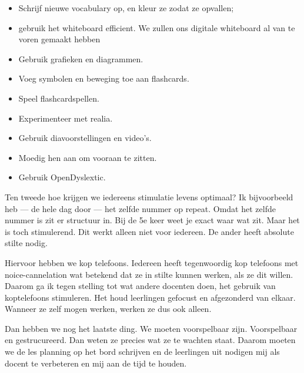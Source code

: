                 \begin{itemize}
                    \setlength\itemsep{0em}
                    \item Schrijf nieuwe vocabulary op, en kleur ze zodat ze opvallen;
                    \item gebruik het whiteboard efficient. We zullen ons digitale whiteboard al van te voren gemaakt hebben
                    \item Gebruik grafieken en diagrammen.
                    \item Voeg symbolen en beweging toe aan flashcards.
                    \item Speel flashcardspellen.
                    \item Experimenteer met realia.
                    \item Gebruik diavoorstellingen en video's.
                    \item Moedig hen aan om vooraan te zitten.
                    \item Gebruik OpenDyslextic.
                \end{itemize}
                
                \bigskip
                
                \noindent Ten tweede hoe krijgen we iedereens stimulatie levens optimaal? Ik bijvoorbeeld heb — de hele dag door — het zelfde nummer op repeat. Omdat het zelfde nummer is zit er structuur in. Bij de 5e keer weet je exact waar wat zit. Maar het is toch stimulerend. Dit werkt alleen niet voor iedereen. De ander heeft absolute stilte nodig.
                
                \bigskip
                
                \noindent Hiervoor hebben we kop telefoons. Iedereen heeft tegenwoordig kop telefoons met noice-cannelation wat betekend dat ze in stilte kunnen werken, als ze dit willen. Daarom ga ik tegen stelling tot wat andere docenten doen, het gebruik van koptelefoons stimuleren. Het houd leerlingen gefocust en afgezonderd van elkaar. Wanneer ze zelf mogen werken, werken ze dus ook alleen.
                
                \bigskip
                
                \noindent Dan hebben we nog het laatste ding. We moeten voorspelbaar zijn. Voorspelbaar en gestrucureerd. Dan weten ze precies wat ze te wachten staat. Daarom moeten we de les planning op het bord schrijven en de leerlingen uit nodigen mij als docent te verbeteren en mij aan de tijd te houden. 